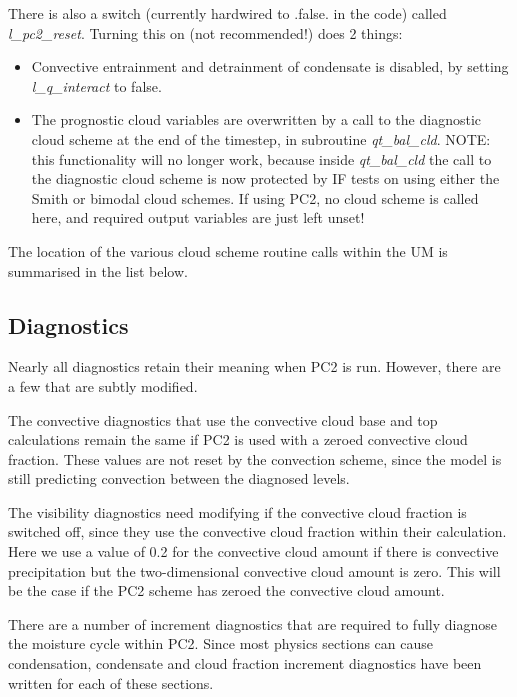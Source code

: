 \documentclass{UMDP_article}
\begin{document}
There is also a switch (currently hardwired to .false. in the code) called
{\it l\_pc2\_reset}.  Turning this on (not recommended!) does 2 things:

\begin{itemize}
\item Convective entrainment and detrainment of condensate is disabled,
by setting {\it l\_q\_interact} to false.
\item The prognostic cloud variables are overwritten by a call to
the diagnostic cloud scheme at the end of the timestep,
in subroutine {\it qt\_bal\_cld}.
NOTE: this functionality will no longer work, because inside {\it qt\_bal\_cld}
the call to the diagnostic cloud scheme is now protected by IF tests on
using either the Smith or bimodal cloud schemes.  If using PC2, no cloud scheme
is called here, and required output variables are just left unset!
\end{itemize}

The location of the various cloud scheme routine calls within the UM
is summarised in the list below.



\subsection{Diagnostics}
\label{sec:diags}

Nearly all diagnostics retain their meaning when PC2 is run. However, there
are a few that are subtly modified.

The convective diagnostics that use the convective cloud base and top
calculations remain the same if PC2 is used with a zeroed convective
cloud fraction. These values are not reset by the convection scheme, since
the model is still predicting convection between the diagnosed levels.

The visibility diagnostics need modifying if the convective cloud
fraction is switched off, since they use the convective cloud fraction
within their calculation. Here we use a value of 0.2 for the convective
cloud amount if there is convective precipitation but the two-dimensional
convective cloud amount is zero. This will be the case if the PC2
scheme has zeroed the convective cloud amount.

There are a number of increment diagnostics that are required to
fully diagnose the moisture cycle within PC2. Since most physics
sections can cause condensation, condensate and cloud fraction increment
diagnostics have been written for each of these sections.
\end{document}
